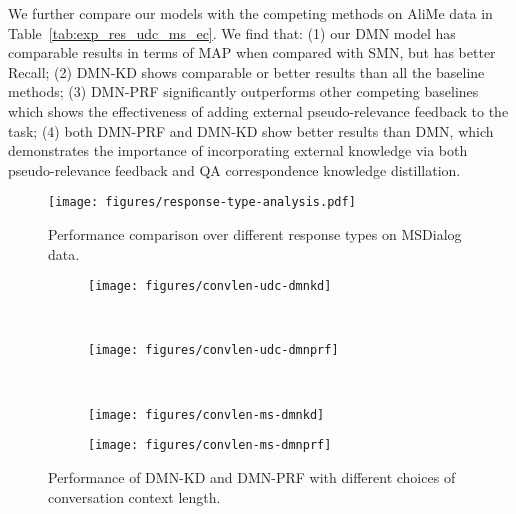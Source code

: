We further compare our models with the competing methods on AliMe data in Table~\ref{tab:exp_res_udc_ms_ec}. We find that: (1) our DMN model has comparable results in terms of MAP when compared with SMN, but has better Recall; (2) DMN-KD shows comparable or better results than all the baseline methods; (3) DMN-PRF significantly outperforms other competing baselines which shows the effectiveness of adding external pseudo-relevance feedback to the task; (4) both DMN-PRF and DMN-KD show better results than DMN, which demonstrates the importance of incorporating external knowledge via both pseudo-relevance feedback and QA correspondence knowledge distillation. 

\begin{figure}[th]
	\center
	\texttt{[image: figures/response-type-analysis.pdf]}
	\vspace{-0.4cm}
	\caption{Performance comparison over different response types on MSDialog data.}\label{fig:result_diff_response_type}
\end{figure}



\begin{figure*}
	\centering
	\begin{subfigure}[b]{0.245\textwidth}
		\texttt{[image: figures/convlen-udc-dmnkd]}
		\label{fig:convlen-udc-dmnkd}
	\end{subfigure}
	\hspace{-0.1in}
	~ %
	\begin{subfigure}[b]{0.245\textwidth}
		\texttt{[image: figures/convlen-udc-dmnprf]}
		\label{fig:convlen-udc-dmnprf}
	\end{subfigure}
	\hspace{-0.1in}
	~ %
	\begin{subfigure}[b]{0.245\textwidth}
		\texttt{[image: figures/convlen-ms-dmnkd]}
		\label{fig:convlen-ms-dmnkd}
	\end{subfigure}
	\hspace{-0.1in}
	\begin{subfigure}[b]{0.245\textwidth}
		\texttt{[image: figures/convlen-ms-dmnprf]}
		\label{fig:convlen-ms-dmnprf}
	\end{subfigure}
	\vspace{-0.25in}
	\caption{Performance of DMN-KD and DMN-PRF with different choices of conversation context length.}\label{fig:tune_convlen}
\end{figure*}

